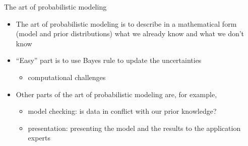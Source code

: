 \documentclass[10pt,handout]{beamer}
\begin{document}
\begin{frame}{The art of probabilistic modeling}

  \begin{itemize}
  \item The art of probabilistic modeling is to describe in a
    mathematical form (model and prior distributions) what we already
    know and what we don't know
\vspace{\baselineskip}
  \item<2-> ``Easy'' part is to use Bayes rule to update the uncertainties
    \begin{itemize}
    \item computational challenges
    \end{itemize}
\vspace{\baselineskip}
  \item<3-> Other parts of the art of probabilistic modeling are, for example,
    \begin{itemize}
    \item model checking: is data in conflict with our prior knowledge?
    \item presentation: presenting the model and the results to the application experts
    \end{itemize}
  \end{itemize}
\end{frame}
\end{document}
